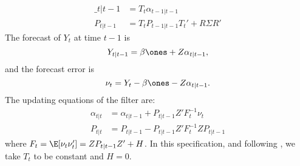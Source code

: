 \begin{align}
	\_{t|t-1} &= T_t \alpha_{t-1|t-1}\\
	P_{t|t-1} &= T_t P_{t-1|t-1}T_t' + R\Sigma R'
\end{align}
The forecast of $Y_t$ at time $t-1$ is $$Y_{t|t-1} = \beta\ones + Z\alpha_{t|t-1},$$ and the forecast error is $$\nu_t=Y_t-\beta\ones - Z\alpha_{t|t-1}.$$ The updating equations of the filter are:
\begin{align}
	\alpha_{t|t} &= \alpha_{t|t-1} + P_{t|t-1} Z'F_t^{-1}\nu_t\\
	P_{t|t}& = P_{t|t-1} - P_{t|t-1}Z'F_t^{-1} Z P_{t|t-1}
\end{align}
where $F_t = \E[\nu_t\nu_t'] = Z P_{t|t-1}Z' + H$. In this specification, and following , we take $T_t$ to be constant and $H=0$.


